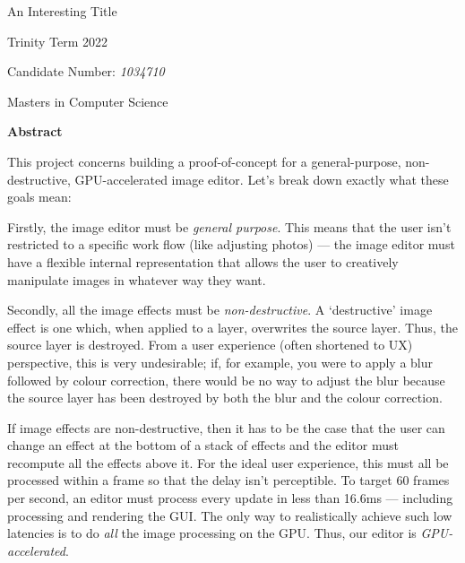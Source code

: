 \documentclass[12pt]{article}
\begin{document}

\begin{titlepage}
    \begin{center}
        \vspace*{2in}

        \Huge
        An Interesting Title

        \vspace*{2in}

        \Large

        Trinity Term 2022

        \vspace*{0.25in}
        Candidate Number: \emph{1034710}

        \vspace*{0.25in}
        Masters in Computer Science
    \end{center}
\end{titlepage}



\begin{center}
    \large \textbf{Abstract}
\end{center}

This project concerns building a proof-of-concept for a general-purpose, non-destructive,
GPU-accelerated image editor.  Let's break down exactly what these goals mean:

Firstly, the image editor must be \emph{general purpose}.  This means that the user isn't restricted
to a specific work flow (like adjusting photos) --- the image editor must have a flexible internal
representation that allows the user to creatively manipulate images in whatever way they want.

Secondly, all the image effects must be \emph{non-destructive}.  A `destructive' image effect is one
which, when applied to a layer, overwrites the source layer.  Thus, the source layer is destroyed.
From a user experience (often shortened to UX) perspective, this is very undesirable; if, for
example, you were to apply a blur followed by colour correction, there would be no way to adjust the
blur because the source layer has been destroyed by both the blur and the colour correction.

If image effects are non-destructive, then it has to be the case that the user can change an effect
at the bottom of a stack of effects and the editor must recompute all the effects above it.  For the
ideal user experience, this must all be processed within a frame so that the delay isn't
perceptible.  To target 60 frames per second, an editor must process every update in less than
16.6ms --- including processing and rendering the GUI.  The only way to realistically achieve such
low latencies is to do \emph{all} the image processing on the GPU.  Thus, our editor is
\emph{GPU-accelerated}.
\end{document}
